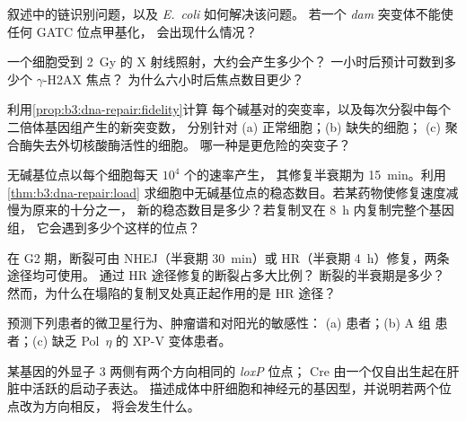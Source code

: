 \begin{exercise}[$\star$]\label{exo:b3:dna-repair:3}
叙述中的链识别问题，以及 \emph{E.~coli} 如何解决该问题。
若一个 \emph{dam} 突变体不能使任何 GATC 位点甲基化，
会出现什么情况？
\end{exercise}

\begin{exercise}[$\star$]\label{exo:b3:dna-repair:4}
一个细胞受到 \qty{2}{Gy} 的 X 射线照射，大约会产生多少个？
一小时后预计可数到多少个 $\gamma$-H2AX 焦点？
为什么六小时后焦点数目更少？
\end{exercise}

\begin{exercise}[$\star\star$]\label{exo:b3:dna-repair:5}
利用\cref{prop:b3:dna-repair:fidelity}计算
每个碱基对的突变率，以及每次分裂中每个二倍体基因组产生的新突变数，
分别针对 (a) 正常细胞；(b) 缺失的细胞；
(c) 聚合酶失去外切核酸酶活性的细胞。
哪一种是更危险的突变子？
\end{exercise}

\begin{exercise}[$\star\star$]\label{exo:b3:dna-repair:6}
无碱基位点以每个细胞每天 $10^{4}$ 个的速率产生，
其修复半衰期为 \qty{15}{min}。利用\cref{thm:b3:dna-repair:load}
求细胞中无碱基位点的稳态数目。若某药物使修复速度减慢为原来的十分之一，
新的稳态数目是多少？若复制叉在 \qty{8}{h} 内复制完整个基因组，
它会遇到多少个这样的位点？
\end{exercise}

\begin{exercise}[$\star\star$]\label{exo:b3:dna-repair:7}
在 G2 期，断裂可由 NHEJ（半衰期 \qty{30}{min}）或 HR（半衰期 \qty{4}{h}）修复，两条途径均可使用。
通过 HR 途径修复的断裂占多大比例？
断裂的半衰期是多少？
然而，为什么在塌陷的复制叉处真正起作用的是 HR 途径？
\end{exercise}

\begin{exercise}[$\star\star$]\label{exo:b3:dna-repair:8}
预测下列患者的微卫星行为、肿瘤谱和对阳光的敏感性：
(a) 患者；(b)  A 组
患者；(c) 缺乏 Pol~$\eta$ 的
XP-V 变体患者。
\end{exercise}

\begin{exercise}[$\star\star$]\label{exo:b3:dna-repair:9}
某基因的外显子 3 两侧有两个方向相同的 \emph{loxP} 位点；
Cre 由一个仅自出生起在肝脏中活跃的启动子表达。
描述成体中肝细胞和神经元的基因型，并说明若两个位点改为方向相反，
将会发生什么。
\end{exercise}

